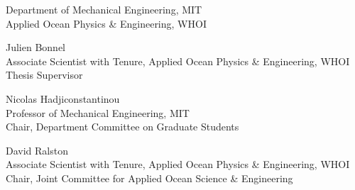 \begin{titlepage}
\begin{center}
\begin{singlespace}

    \signature{Author}{\small Department of Mechanical Engineering, MIT \\ Applied Ocean Physics \& Engineering, WHOI \\ \@date}
    \vspace{1em}
    \signature{Certified by}{Julien Bonnel \\ \small Associate Scientist with Tenure, Applied Ocean Physics \& Engineering, WHOI \\ Thesis Supervisor}
    \vspace{1em}
    \signature{Accepted by}{Nicolas Hadjiconstantinou \\ \small Professor of Mechanical Engineering, MIT \\ Chair, Department Committee on Graduate Students}
    \vspace{1em}
    \signature{Accepted by}{David Ralston \\ \small Associate Scientist with Tenure, Applied Ocean Physics \& Engineering, WHOI \\ Chair, Joint Committee for Applied Ocean Science \& Engineering}
    \end{singlespace}
  \end{center}
  \makeatother
\end{titlepage}

\newpage
\null
\newpage